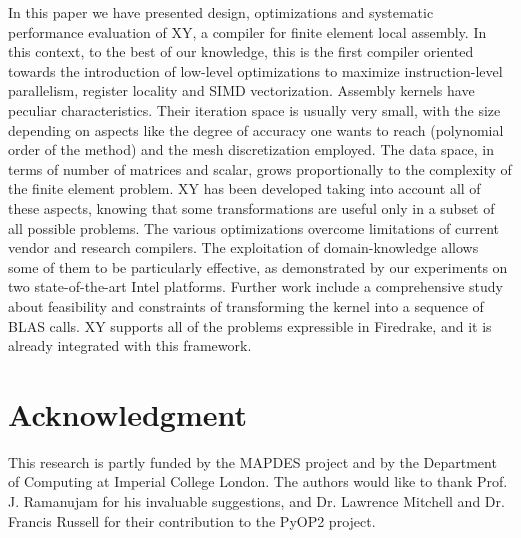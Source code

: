 \documentclass[conference]{IEEEtran}
\begin{document}
In this paper we have presented design, optimizations and systematic performance evaluation of XY, a compiler for finite element local assembly. In this context, to the best of our knowledge, this is the first compiler oriented towards the introduction of low-level optimizations to maximize instruction-level parallelism, register locality and SIMD vectorization. Assembly kernels have peculiar characteristics. Their iteration space is usually very small, with the size depending on aspects like the degree of accuracy one wants to reach (polynomial order of the method) and the mesh discretization employed. The data space, in terms of number of matrices and scalar, grows proportionally to the complexity of the finite element problem. XY has been developed taking into account all of these aspects, knowing that some transformations are useful only in a subset of all possible problems. The various optimizations overcome limitations of current vendor and research compilers. The exploitation of domain-knowledge allows some of them to be particularly effective, as demonstrated by our experiments on two state-of-the-art Intel platforms. Further work include a comprehensive study about feasibility and constraints of transforming the kernel into a sequence of BLAS calls. XY supports all of the problems expressible in Firedrake, and it is already integrated with this framework. 



\section*{Acknowledgment}

This research is partly funded by the MAPDES project and by the Department of Computing at Imperial College London. The authors would like to thank Prof. J. Ramanujam for his invaluable suggestions, and Dr. Lawrence Mitchell and Dr. Francis Russell for their contribution to the PyOP2 project.






\end{document}
